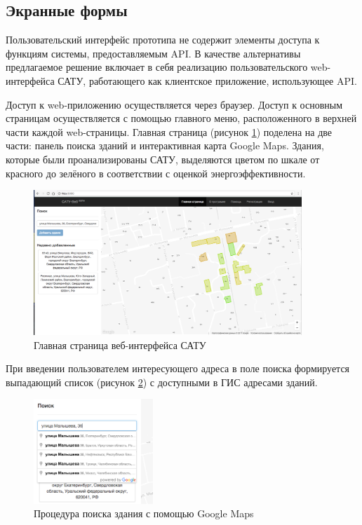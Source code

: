\subsection{Экранные формы}

	Пользовательский интерфейс прототипа не содержит элементы доступа к функциям системы, предоставляемым API. В качестве альтернативы предлагаемое решение включает в себя реализацию пользовательского web-интерфейса САТУ, работающего как клиентское приложение, использующее API.
 
	Доступ к web-приложению осуществляется через браузер. Доступ к основным страницам осуществляется с помощью главного меню, расположенного в верхней части каждой web-страницы. Главная страница (рисунок \ref{scrshot:main_1}) поделена на две части: панель поиска зданий и интерактивная карта Google Maps. Здания, которые были проанализированы САТУ, выделяются цветом по шкале от красного до зелёного в соответствии с оценкой энергоэффективности.

	\begin{figure}[h!]
		\centering
		\includegraphics[width=0.9\textwidth]{images/scrshots/main_1}
		\caption{Главная страница веб-интерфейса САТУ}
		\label{scrshot:main_1}
	\end{figure}

	При введении пользователем интересующего адреса в поле поиска формируется выпадающий список (рисунок \ref{scrshot:search_field_1}) с доступными в ГИС адресами зданий.

	\pagebreak

	\begin{figure}[h!]
		\centering
		\includegraphics[width=0.4\textwidth]{images/scrshots/search_field_1}
		\caption{Процедура поиска здания с помощью Google Maps}
		\label{scrshot:search_field_1}
	\end{figure}

